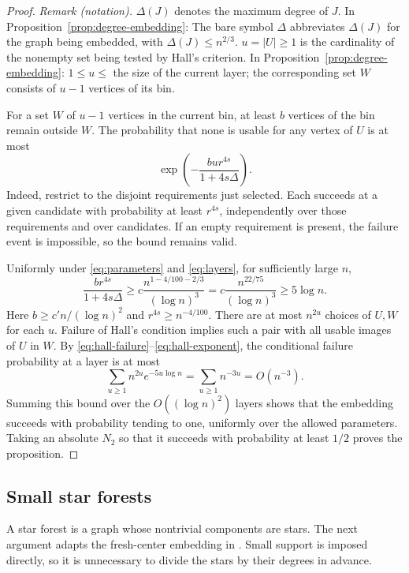 \documentclass[11pt]{article}
\theoremstyle{remark}
\numberwithin{equation}{section}
\begin{document}
\begin{proof}
\noindent\textit{Remark (notation).} $\Delta(J)$ denotes the maximum degree of $J$. In Proposition~\ref{prop:degree-embedding}: The bare symbol $\Delta$ abbreviates $\Delta(J)$ for the graph being embedded, with $\Delta(J)\leq n^{2/3}$. $u=|U|\geq1$ is the cardinality of the nonempty set being tested by Hall's criterion. In Proposition~\ref{prop:degree-embedding}: $1\leq u\leq$ the size of the current layer; the corresponding set $W$ consists of $u-1$ vertices of its bin.


For a set $W$ of $u-1$ vertices in the current bin, at least $b$
vertices of the bin remain outside $W$. The probability that
none is usable for any vertex of $U$ is at most
\begin{equation}\label{eq:hall-failure}
 \exp\!\left(-\frac{bu r^{4s}}{1+4s\Delta}\right).
\end{equation}
Indeed, restrict to the disjoint requirements just selected.
Each succeeds at a given candidate with probability at least
$r^{4s}$, independently over those requirements and over
candidates. If an empty requirement is present, the failure
event is impossible, so the bound remains valid.

Uniformly under \eqref{eq:parameters} and \eqref{eq:layers},
for sufficiently large $n$,
\begin{equation}\label{eq:hall-exponent}
 \frac{b r^{4s}}{1+4s\Delta}
 \geq c\frac{n^{1-4/100-2/3}}{(\log n)^3}
 =c\frac{n^{22/75}}{(\log n)^3}\geq5\log n.
\end{equation}
Here $b\geq c'n/(\log n)^2$ and $r^{4s}\geq n^{-4/100}$.
There are at most $n^{2u}$ choices of $U,W$ for each $u$.
Failure of Hall's condition implies such a pair with all usable
images of $U$ in $W$. By \eqref{eq:hall-failure}--\eqref{eq:hall-exponent},
the conditional failure probability at a layer is at most
\[
 \sum_{u\geq1}n^{2u}e^{-5u\log n}
 =\sum_{u\geq1}n^{-3u}=O(n^{-3}).
\]
Summing this bound over the $O((\log n)^2)$ layers shows that
the embedding succeeds with probability tending to one,
uniformly over the allowed parameters. Taking an absolute
$N_2$ so that it succeeds with probability at least $1/2$
proves the proposition.
\end{proof}

\subsection{Small star forests}

A star forest is a graph whose nontrivial components are stars.
The next argument adapts the fresh-center embedding in
\cite[Claim~6.6]{AHPT26}. Small support is imposed directly,
so it is unnecessary to divide the stars by their degrees in
advance.
\end{document}
